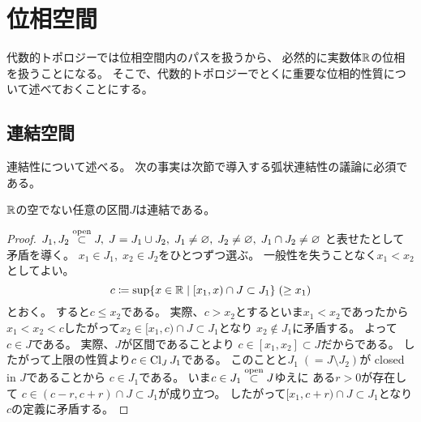 \documentclass[report]{jlreq}
\begin{document}
%
\chapter{位相空間}

代数的トポロジーでは位相空間内のパスを扱うから、
必然的に実数体$\R$の位相を扱うことになる。
そこで、代数的トポロジーでとくに重要な位相的性質について述べておくことにする。

%
\section{連結空間}

連結性について述べる。
次の事実は次節で導入する弧状連結性の議論に必須である。

\begin{proposition}[$\R$の区間は連結]
    $\R$の空でない任意の区間$J$は連結である。
\end{proposition}

\begin{proof}
    $J_1, J_2 \stackrel{\text{open}}{\subset} J, \;
        J = J_1 \cup J_2, \;
        J_1 \neq \varnothing, \;
        J_2 \neq \varnothing, \;
        J_1 \cap J_2 \neq \varnothing$
    と表せたとして矛盾を導く。
    $x_1 \in J_1, \; x_2 \in J_2$をひとつずつ選ぶ。
    一般性を失うことなく$x_1 < x_2$としてよい。
    \begin{equation}
        c \coloneqq \sup \{
            x \in \mathbb{R}
            \mid
            [x_1, x) \cap J \subset J_1
        \}
        \; (\ge x_1)
    \end{equation}
    とおく。
    すると$c \le x_2$である。
    実際、$c > x_2$とするといま$x_1 < x_2$であったから
    $x_1 < x_2 < c$したがって$x_2 \in [x_1, c) \cap J \subset J_1$となり
    $x_2 \notin J_1$に矛盾する。
    よって$c \in J$である。
    実際、$J$が区間であることより
    $c \in [x_1, x_2] \subset J$だからである。
    したがって上限の性質より$c \in \operatorname{Cl}_J J_1$である。
    このことと$J_1 \; (= J \setminus J_2)$が closed in $J$であることから
    $c \in J_1$である。
    いま$c \in J_1 \stackrel{\text{open}}{\subset} J$ゆえに
    ある$r > 0$が存在して
    $c \in (c - r, c + r) \cap J \subset J_1$が成り立つ。
    したがって$[x_1, c + r) \cap J \subset J_1$となり
    $c$の定義に矛盾する。
\end{proof}
\end{document}
